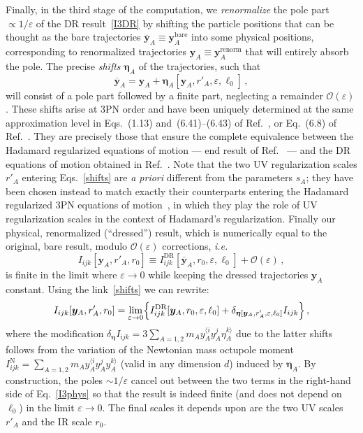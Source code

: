 \documentclass[prd,preprint,superscriptaddress,tightenlines,nofootinbib,
  eqsecnum,showpacs]{revtex4}
\begin{document}
Finally, in the third stage of the computation, we
\textit{renormalize} the pole part $\propto 1/\varepsilon$ of the DR
result~\eqref{I3DR} by shifting the particle positions that can be
thought as the bare trajectories
$\overline{\bm{y}}_A\equiv\bm{y}^\text{bare}_A$ into some physical
positions, corresponding to renormalized trajectories
$\bm{y}_A\equiv\bm{y}^\text{renorm}_A$ that will entirely absorb the
pole. The precise \textit{shifts} $\bm{\eta}_A$ of the trajectories,
such that
%
\begin{equation}\label{shifts}
\overline{\bm{y}}_A = \bm{y}_A + \bm{\eta}_A[\bm{y}_A,
  r'_A,\varepsilon,\ell_0]\,,
\end{equation}
%
will consist of a pole part followed by a finite part, neglecting a
remainder $\mathcal{O}(\varepsilon)$. These shifts arise at 3PN order
and have been uniquely determined at the same approximation level in
Eqs.~(1.13) and~(6.41)--(6.43) of Ref.~\cite{BDE04}, or Eq.~(6.8) of
Ref.~\cite{BDEI05dr}.  They are precisely those that ensure the
complete equivalence between the Hadamard regularized equations of
motion --- end result of Ref.~\cite{BFeom} --- and the DR equations of
motion obtained in Ref.~\cite{BDE04}. Note that the two UV
regularization scales $r'_A$ entering Eqs.~\eqref{shifts} are
\textit{a priori} different from the parameters $s_A$; they have been
chosen instead to match exactly their counterparts entering the
Hadamard regularized 3PN equations of motion~\cite{BFeom}, in which
they play the role of UV regularization scales in the context of
Hadamard's regularization. Finally our physical, renormalized
(``dressed'') result, which is numerically equal to the original, bare
result, modulo $\mathcal{O}(\varepsilon)$ corrections, \textit{i.e.}
%
\begin{equation}\label{physDR}
I_{ijk}[\bm{y}_A, r'_A, r_0] \equiv
I^\text{DR}_{ijk}[\overline{\bm{y}}_A, r_0, \varepsilon, \ell_0] +
\mathcal{O}(\varepsilon)\,,
\end{equation}
%
is finite in the limit where $\varepsilon \to 0$ while keeping the
dressed trajectories $\bm{y}_A$ constant. Using the
link~\eqref{shifts} we can rewrite:
%
\begin{equation}\label{I3phys}
I_{ijk}[\bm{y}_A, r'_A, r_0] = \lim_{\varepsilon\to
  0}\Bigl\{I_{ijk}^\text{DR}[\bm{y}_A, r_0, \varepsilon, \ell_0] +
\delta_{\bm{\eta}[\bm{y}_A, r'_A,\varepsilon,\ell_0]}I_{ijk}\Bigr\}\,,
\end{equation}
%
where the modification $\delta_{\bm{\eta}}I_{ijk} = 3 \sum_{A=1,2} m_A
y_A^{\langle i}y_A^j\eta_A^{k\rangle}$ due to the latter shifts
follows from the variation of the Newtonian mass octupole moment
$I^\text{N}_{ijk} = \sum_{A=1,2} m_A y_A^{\langle
  i}y_A^jy_A^{k\rangle}$ (valid in any dimension $d$) induced by
$\bm{\eta}_A$. By construction, the poles $\sim 1/\varepsilon$ cancel
out between the two terms in the right-hand side of Eq.~\eqref{I3phys}
so that the result is indeed finite (and does not depend on $\ell_0$)
in the limit $\varepsilon\to 0$. The final scales it depends upon are
the two UV scales $r'_A$ and the IR scale $r_0$.
\end{document}

